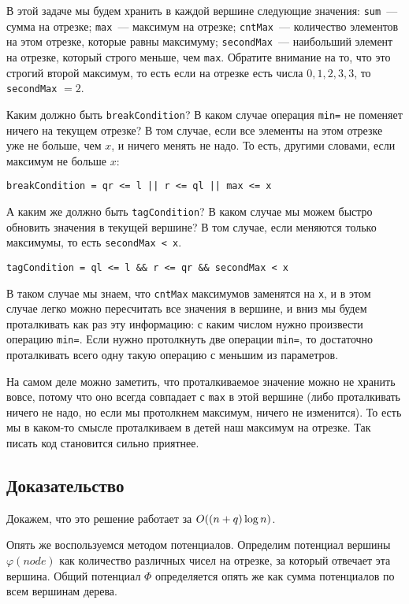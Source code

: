 В этой задаче мы будем хранить в каждой вершине следующие значения: \verb+sum+~--- сумма на отрезке; \verb+max+~--- максимум на отрезке; \verb+cntMax+~--- количество элементов на этом отрезке, которые равны максимуму; \verb+secondMax+~--- наибольший элемент на отрезке, который строго меньше, чем \verb+max+. Обратите внимание на то, что это строгий второй максимум, то есть если на отрезке есть числа $0, 1, 2, 3, 3$, то \verb+secondMax+ $ = 2$.

Каким должно быть \verb+breakCondition+? В каком случае операция \verb+min=+ не поменяет ничего на текущем отрезке? В том случае, если все элементы на этом отрезке уже не больше, чем $x$, и ничего менять не надо. То есть, другими словами, если максимум не больше $x$:

\verb+breakCondition = qr <= l || r <= ql || max <= x+

А каким же должно быть \verb+tagCondition+? В каком случае мы можем быстро обновить значения в текущей вершине? В том случае, если меняются только максимумы, то есть \verb+secondMax < x+.

\verb+tagCondition = ql <= l && r <= qr && secondMax < x+

В таком случае мы знаем, что \verb+cntMax+ максимумов заменятся на \verb+x+, и в этом случае легко можно пересчитать все значения в вершине, и вниз мы будем проталкивать как раз эту информацию: с каким числом нужно произвести операцию \verb+min=+. Если нужно протолкнуть две операции \verb+min=+, то достаточно проталкивать всего одну такую операцию с меньшим из параметров.

На самом деле можно заметить, что проталкиваемое значение можно не хранить вовсе, потому что оно всегда совпадает с \verb+max+ в этой вершине (либо проталкивать ничего не надо, но если мы протолкнем максимум, ничего не изменится). То есть мы в каком-то смысле проталкиваем в детей наш максимум на отрезке. Так писать код становится сильно приятнее.

\subsection{Доказательство}

Докажем, что это решение работает за $O((n + q) \log n)$.

Опять же воспользуемся методом потенциалов. Определим потенциал вершины $\varphi(node)$ как количество различных чисел на отрезке, за который отвечает эта вершина. Общий потенциал $\Phi$ определяется опять же как сумма потенциалов по всем вершинам дерева.


